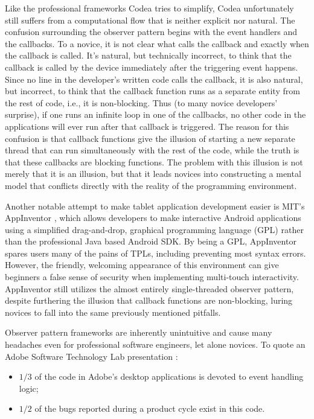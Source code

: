 Like the professional frameworks Codea tries to simplify, Codea unfortunately still suffers from a computational flow that is neither explicit nor natural. The confusion surrounding the observer pattern begins with the event handlers and the callbacks. To a novice, it is not clear what calls the callback and exactly when the callback is called. It's natural, but technically incorrect, to think that the callback is called by the device immediately after the triggering event happens. Since no line in the developer's written code calls the callback, it is also natural, but incorrect, to think that the callback function runs as a separate entity from the rest of code, i.e., it is non-blocking. Thus (to many novice developers' surprise), if one runs an infinite loop in one of the callbacks, no other code in the applications will ever run after that callback is triggered. The reason for this confusion is that callback functions give the illusion of starting a new separate thread that can run simultaneously with the rest of the code, while the truth is that these callbacks are blocking functions. The problem with this illusion is not merely that it is an illusion, but that it leads novices into constructing a mental model that conflicts directly with the reality of the programming environment. 

Another notable attempt to make tablet application development easier is MIT's AppInventor \cite{AppInventor}, which allows developers to make interactive Android applications using a simplified drag-and-drop, graphical programming language (GPL) rather than the professional Java based Android SDK. By being a GPL, AppInventor spares users many of the pains of TPLs, including preventing most syntax errors. However, the friendly, welcoming appearance of this environment can give beginners a false sense of security when implementing multi-touch interactivity. AppInventor still utilizes the almost entirely single-threaded observer pattern, despite furthering the illusion that callback functions are non-blocking, luring novices to fall into the same previously mentioned pitfalls.

Observer pattern frameworks are inherently unintuitive and cause many headaches even for professional software engineers, let alone novices. To quote an Adobe Software Technology Lab presentation \cite{Parent}:

\begin{itemize}
\item $1/3$ of the code in Adobe's desktop applications is devoted to event handling logic;
\item $1/2$ of the bugs reported during a product cycle exist in this code.
\end{itemize}

